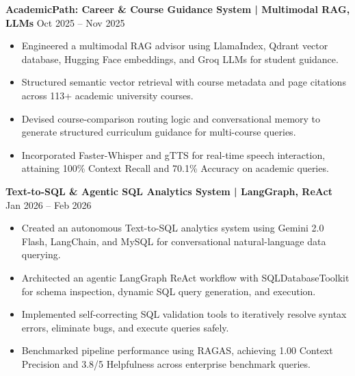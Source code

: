 \documentclass[10pt]{article}
\begin{document}
\vspace{6pt}

\textbf{AcademicPath: Career \& Course Guidance System | Multimodal RAG, LLMs} \hfill Oct 2025 -- Nov 2025
\begin{itemize}[noitemsep, topsep=2pt, partopsep=0pt, parsep=1.5pt]
    \item Engineered a multimodal RAG advisor using LlamaIndex, Qdrant vector database, Hugging Face embeddings, and Groq LLMs for student guidance.
    \item Structured semantic vector retrieval with course metadata and page citations across 113+ academic university courses.
    \item Devised course-comparison routing logic and conversational memory to generate structured curriculum guidance for multi-course queries.
    \item Incorporated Faster-Whisper and gTTS for real-time speech interaction, attaining 100\% Context Recall and 70.1\% Accuracy on academic queries.
\end{itemize}

\vspace{6pt}

\textbf{Text-to-SQL \& Agentic SQL Analytics System | LangGraph, ReAct} \hfill Jan 2026 -- Feb 2026
\begin{itemize}[noitemsep, topsep=2pt, partopsep=0pt, parsep=1.5pt]
    \item Created an autonomous Text-to-SQL analytics system using Gemini 2.0 Flash, LangChain, and MySQL for conversational natural-language data querying.
    \item Architected an agentic LangGraph ReAct workflow with SQLDatabaseToolkit for schema inspection, dynamic SQL query generation, and execution.
    \item Implemented self-correcting SQL validation tools to iteratively resolve syntax errors, eliminate bugs, and execute queries safely.
    \item Benchmarked pipeline performance using RAGAS, achieving 1.00 Context Precision and 3.8/5 Helpfulness across enterprise benchmark queries.
\end{itemize}

\vspace{6pt}
\end{document}
